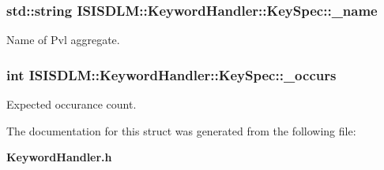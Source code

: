 \subsubsection{\setlength{\rightskip}{0pt plus 5cm}std::string {\bf ISISDLM::Keyword\-Handler::Key\-Spec::\_\-name}}\label{structISISDLM_1_1KeywordHandler_1_1KeySpec_o0}


Name of Pvl aggregate. 

\subsubsection{\setlength{\rightskip}{0pt plus 5cm}int {\bf ISISDLM::Keyword\-Handler::Key\-Spec::\_\-occurs}}\label{structISISDLM_1_1KeywordHandler_1_1KeySpec_o1}


Expected occurance count. 



The documentation for this struct was generated from the following file:\begin{CompactItemize}
\item 
{\bf Keyword\-Handler.h}\end{CompactItemize}
